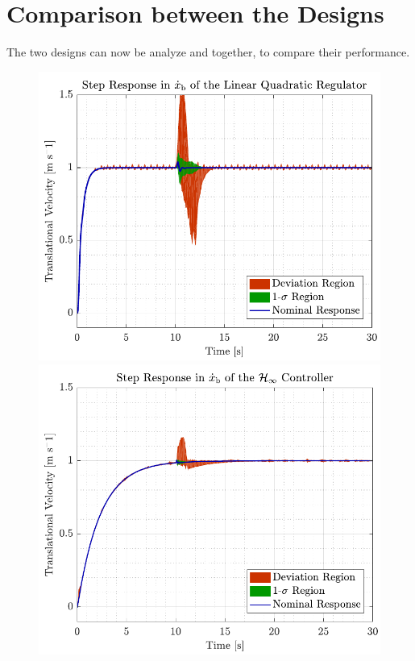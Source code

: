 \section{Comparison between the Designs}\label{sec:comparison}
The two designs can now be analyze and together, to compare their performance.

\begin{figure}[H]
    \captionbox 
    {   
        \label{fig:xbdot_mc_lqr}
    }                                                                 
    {                                                                  
        \includegraphics[width=.45\textwidth]{figures/xbdot_mc_lqr}         
    }                                                                    
    \hspace{5pt}                                                          
    \captionbox  
    {      
        \label{fig:xbdot_mc_rob}
    }                                                                          
    {
        \includegraphics[width=.45\textwidth]{figures/xbdot_mc_rob}
    }
\end{figure}

